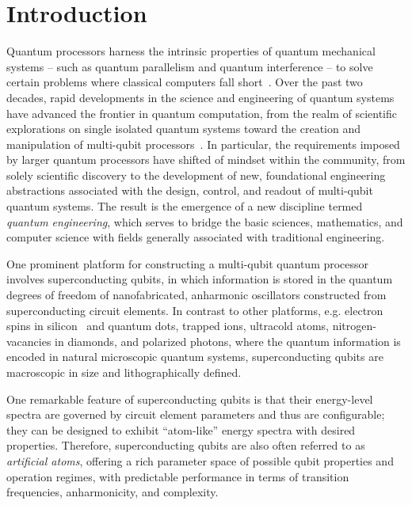 \documentclass[aip,apr,twocolumn,showpacs,superscriptaddress,groupedaddress,nofootinbib,reprint]{revtex4-1}  %
\begin{document}
\tableofcontents
\section{Introduction}
Quantum processors harness the intrinsic properties of quantum mechanical systems -- such as quantum parallelism and quantum interference -- to solve certain problems where classical computers fall short~\cite{Feynman1982,Lloyd1996,DiVincenzo2000,Dowling2003,Ladd2010,Nielsen2011}. Over the past two decades, rapid developments in the science and engineering of quantum systems have advanced the frontier in quantum computation, from the realm of scientific explorations on single isolated quantum systems toward the creation and manipulation of multi-qubit processors~\cite{Monroe2013,Bernien2017}. In particular, the requirements imposed by larger quantum processors have shifted of mindset within the community, from solely scientific discovery to the development of new, foundational engineering abstractions associated with the design, control, and readout of multi-qubit quantum systems. The result is the emergence of a new discipline termed \textit{quantum engineering}, which serves to bridge the basic sciences, mathematics, and computer science with fields generally associated with traditional engineering.

One prominent platform for constructing a multi-qubit quantum processor involves superconducting qubits, in which information is stored in the quantum degrees of freedom of nanofabricated, anharmonic oscillators constructed from superconducting circuit elements. In contrast to other platforms, e.g. electron spins in silicon~\cite{Loss1998,Kane1998,Vrijen2000,deSousa2004,Hollenberg2006,Morello2010} and quantum dots\cite{Imamoglu1999,Petta2005,Englund2005,Hanson2007}, trapped ions\cite{Cirac1995,Leibfried2003,Blatt2008,Haffner2008,Blatt2012}, ultracold atoms\cite{Jaksch2005,Lewenstein2007,Bloch2008,Gross2017}, nitrogen-vacancies in diamonds\cite{Hanson2006,Dutt2007}, and polarized photons\cite{Knill2001,Pittman2001,Franson2002,Pittman2003}, where the quantum information is encoded in natural microscopic quantum systems, superconducting qubits are macroscopic in size and lithographically defined.

One remarkable feature of superconducting qubits is that their energy-level spectra are governed by circuit element parameters and thus are configurable; they can be designed to exhibit ``atom-like'' energy spectra with desired properties. Therefore, superconducting qubits are also often referred to as \textit{artificial atoms}, offering a rich parameter space of possible qubit properties and operation regimes, with predictable performance in terms of transition frequencies, anharmonicity, and complexity.
\end{document}
